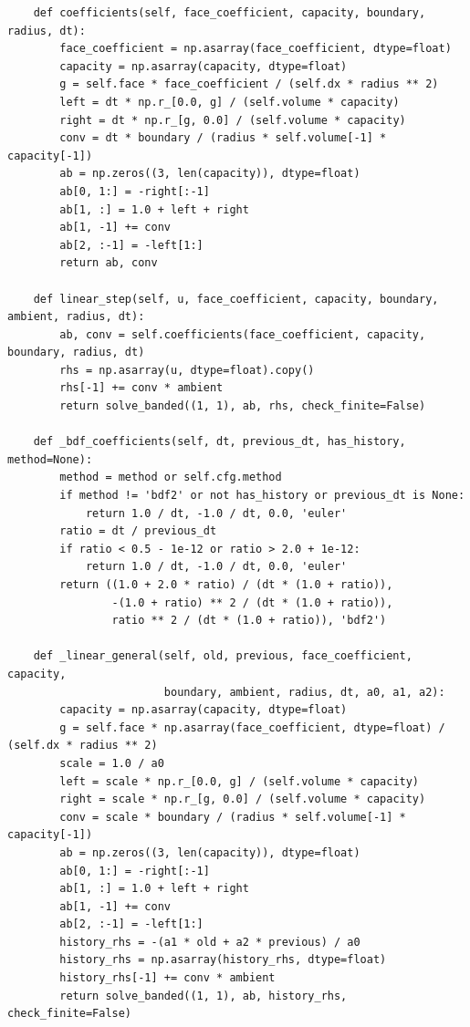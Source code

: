 \begin{verbatim}
    def coefficients(self, face_coefficient, capacity, boundary, radius, dt):
        face_coefficient = np.asarray(face_coefficient, dtype=float)
        capacity = np.asarray(capacity, dtype=float)
        g = self.face * face_coefficient / (self.dx * radius ** 2)
        left = dt * np.r_[0.0, g] / (self.volume * capacity)
        right = dt * np.r_[g, 0.0] / (self.volume * capacity)
        conv = dt * boundary / (radius * self.volume[-1] * capacity[-1])
        ab = np.zeros((3, len(capacity)), dtype=float)
        ab[0, 1:] = -right[:-1]
        ab[1, :] = 1.0 + left + right
        ab[1, -1] += conv
        ab[2, :-1] = -left[1:]
        return ab, conv

    def linear_step(self, u, face_coefficient, capacity, boundary, ambient, radius, dt):
        ab, conv = self.coefficients(face_coefficient, capacity, boundary, radius, dt)
        rhs = np.asarray(u, dtype=float).copy()
        rhs[-1] += conv * ambient
        return solve_banded((1, 1), ab, rhs, check_finite=False)

    def _bdf_coefficients(self, dt, previous_dt, has_history, method=None):
        method = method or self.cfg.method
        if method != 'bdf2' or not has_history or previous_dt is None:
            return 1.0 / dt, -1.0 / dt, 0.0, 'euler'
        ratio = dt / previous_dt
        if ratio < 0.5 - 1e-12 or ratio > 2.0 + 1e-12:
            return 1.0 / dt, -1.0 / dt, 0.0, 'euler'
        return ((1.0 + 2.0 * ratio) / (dt * (1.0 + ratio)),
                -(1.0 + ratio) ** 2 / (dt * (1.0 + ratio)),
                ratio ** 2 / (dt * (1.0 + ratio)), 'bdf2')

    def _linear_general(self, old, previous, face_coefficient, capacity,
                        boundary, ambient, radius, dt, a0, a1, a2):
        capacity = np.asarray(capacity, dtype=float)
        g = self.face * np.asarray(face_coefficient, dtype=float) / (self.dx * radius ** 2)
        scale = 1.0 / a0
        left = scale * np.r_[0.0, g] / (self.volume * capacity)
        right = scale * np.r_[g, 0.0] / (self.volume * capacity)
        conv = scale * boundary / (radius * self.volume[-1] * capacity[-1])
        ab = np.zeros((3, len(capacity)), dtype=float)
        ab[0, 1:] = -right[:-1]
        ab[1, :] = 1.0 + left + right
        ab[1, -1] += conv
        ab[2, :-1] = -left[1:]
        history_rhs = -(a1 * old + a2 * previous) / a0
        history_rhs = np.asarray(history_rhs, dtype=float)
        history_rhs[-1] += conv * ambient
        return solve_banded((1, 1), ab, history_rhs, check_finite=False)


\end{verbatim}
